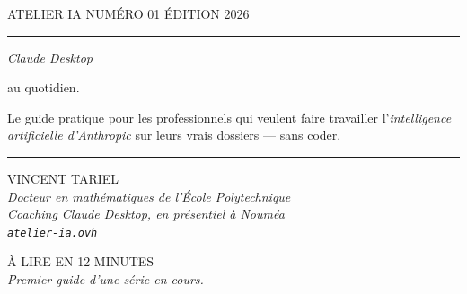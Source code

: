 \documentclass[11pt,a4paper]{article}
\newcommand{\dateline}[1]{{\footnotesize\ttfamily\color{encrefaint}\MakeUppercase{#1}}}
\begin{document}

\thispagestyle{cover}

\vspace*{2cm}

\dateline{Atelier IA \quad\textbar\quad Numéro 01 \quad\textbar\quad Édition 2026}

\vspace{0.3cm}
{\color{encre}\rule{\linewidth}{1pt}}
\vspace{1.5cm}

\begin{flushleft}
{\color{encre}\fontsize{52pt}{56pt}\selectfont\itshape Claude Desktop\par}
\vspace{0.4cm}
{\color{encre}\fontsize{52pt}{56pt}\selectfont au quotidien\textcolor{bordeaux}{.}\par}
\end{flushleft}

\vspace{1.5cm}

\begin{minipage}{0.65\textwidth}
{\large\color{encredoux}
Le guide pratique pour les professionnels qui veulent
faire travailler l'\textit{intelligence artificielle d'Anthropic}
sur leurs vrais dossiers — sans coder.
}
\end{minipage}

\vfill

{\color{encre}\rule{\linewidth}{0.4pt}}

\vspace{0.3cm}

\begin{minipage}{0.6\textwidth}
\dateline{Vincent Tariel}\\[0.2em]
{\footnotesize\itshape Docteur en mathématiques de l'École Polytechnique\\
Coaching Claude Desktop, en présentiel à Nouméa\\
\texttt{atelier-ia.ovh}}
\end{minipage}\hfill
\begin{minipage}{0.35\textwidth}\raggedleft
\dateline{À lire en 12 minutes}\\[0.2em]
{\footnotesize\itshape Premier guide d'une série en cours.}
\end{minipage}
\end{document}
